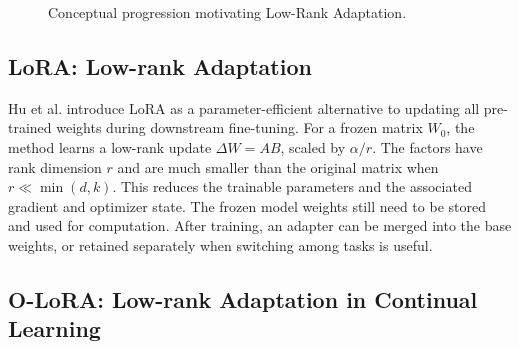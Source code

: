 \begin{figure}[htbp]

	\caption{Conceptual progression motivating Low-Rank Adaptation.}
	\label{fig:lora_motivation}
\end{figure}


\subsection{LoRA: Low-rank Adaptation}

Hu et al. \cite{hu2022lora} introduce LoRA as a parameter-efficient alternative
to updating all pre-trained weights during downstream fine-tuning.
For a frozen matrix $W_0$, the method learns a low-rank update
$\Delta W=AB$, scaled by $\alpha/r$. The factors have rank dimension
$r$ and are much smaller than the original matrix when
$r\ll\min(d,k)$. This reduces the trainable parameters and the associated
gradient and optimizer state. The frozen model weights still need to be
stored and used for computation. After training, an adapter can be merged
into the base weights, or retained separately when switching among tasks
is useful.

\subsection{O-LoRA: Low-rank Adaptation in Continual Learning}

